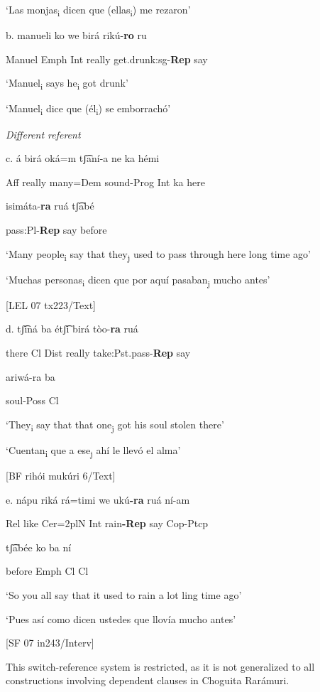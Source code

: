 ‘Las monjas\textsubscript{i} dicen que (ellas\textsubscript{i}) me rezaron’

b.   manueli   ko       we   birá    rikú-\textbf{ro}                       ru

Manuel   Emph    Int   really   get.drunk:sg-\textbf{Rep}   say

‘Manuel\textsubscript{i} says he\textsubscript{i} got drunk’

‘Manuel\textsubscript{i} dice que (él\textsubscript{i}) se emborrachó’ 

  \textit{Different referent}

c.   á   birá   oká=m   tʃ͡aní-a     ne   ka   hémi   

    Aff  really  many=Dem  sound-Prog  Int  ka  here

    isimáta-\textbf{ra}   ruá   tʃ͡abé

    pass:Pl-\textbf{Rep}  say  before

    ‘Many people\textsubscript{i} say that they\textsubscript{j} used to pass through here long time ago’

‘Muchas personas\textsubscript{i} dicen que por aquí pasaban\textsubscript{j} mucho antes’

  [LEL 07 tx223/Text]

d.   tʃ͡iná  ba   étʃ͡i    birá    tòo-\textbf{ra}                ruá  

there   Cl   Dist   really  take:Pst.pass-\textbf{Rep}     say  

ariwá-ra  ba

soul-Poss   Cl

‘They\textsubscript{i} say that that one\textsubscript{j} got his soul stolen there’

‘Cuentan\textsubscript{i} que a ese\textsubscript{j} ahí le llevó el alma’     

[BF rihói mukúri 6/Text]

e.  nápu   riká   rá=timi   we   ukú\textbf{{}-ra}   ruá   ní-am 

  Rel  like  Cer=2plN  Int  rain\textbf{{}-Rep} say  Cop-Ptcp

tʃ͡abée   ko   ba   ní 

before  Emph  Cl  Cl

‘So you all say that it used to rain a lot ling time ago’

‘Pues así como dicen ustedes que llovía mucho antes’

  [SF 07 in243/Interv]            

  This switch-reference system is restricted, as it is not generalized to all constructions involving dependent clauses in Choguita Rarámuri.

